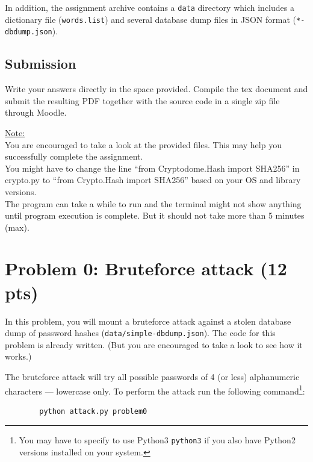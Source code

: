 \documentclass[11pt,letterpaper]{article}
\begin{document}
	\noindent
	In addition, the assignment archive contains a \texttt{data} directory which includes a dictionary file (\texttt{words.list}) and several database dump files in JSON format (\texttt{*-dbdump.json}).
	
	\subsection*{Submission}
	Write your answers directly in the space provided. Compile the tex document and submit the resulting PDF together with the source code in a single zip file through Moodle.
	
	\bigskip
	
	\noindent
	\underline{Note:} \\
	\noindent You are encouraged to take a look at the provided files. This may help you successfully complete the assignment. \\
	\noindent 
	You might have to change the line ``from Cryptodome.Hash import SHA256'' in crypto.py to ``from Crypto.Hash import SHA256'' based on your OS and library versions. \\
	\noindent
	The program can take a while to run and the terminal might not show anything until program execution is complete. But it should not take more than 5 minutes (max).
	
	\newpage
	\section*{Problem 0: Bruteforce attack (12 pts)}
	In this problem, you will mount a bruteforce attack against a stolen database dump of password hashes (\texttt{data/simple-dbdump.json}). The code for this problem is already written. (But you are encouraged to take a look to see how it works.)
	
	The bruteforce attack will try all possible passwords of 4 (or less) alphanumeric characters --- lowercase only. To perform the attack run the following command\footnote{You may have to specify to use Python3 \texttt{python3} if you also have Python2 versions installed on your system.}:
	\begin{Verbatim}
		python attack.py problem0
	\end{Verbatim}
	
\end{document}
